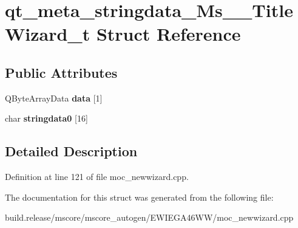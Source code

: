 \hypertarget{structqt__meta__stringdata___ms_____title_wizard__t}{}\section{qt\+\_\+meta\+\_\+stringdata\+\_\+\+Ms\+\_\+\+\_\+\+Title\+Wizard\+\_\+t Struct Reference}
\label{structqt__meta__stringdata___ms_____title_wizard__t}
\subsection*{Public Attributes}
\begin{DoxyCompactItemize}
\item 
\mbox{\label{structqt__meta__stringdata___ms_____title_wizard__t_afd8c085bfa4a76696a9c44feccee56f9}} 
Q\+Byte\+Array\+Data {\bfseries data} \mbox{[}1\mbox{]}
\item 
\mbox{\label{structqt__meta__stringdata___ms_____title_wizard__t_a6640ce8530a2f3f363992cce1e2135d3}} 
char {\bfseries stringdata0} \mbox{[}16\mbox{]}
\end{DoxyCompactItemize}


\subsection{Detailed Description}


Definition at line 121 of file moc\+\_\+newwizard.\+cpp.



The documentation for this struct was generated from the following file\+:\begin{DoxyCompactItemize}
\item 
build.\+release/mscore/mscore\+\_\+autogen/\+E\+W\+I\+E\+G\+A46\+W\+W/moc\+\_\+newwizard.\+cpp\end{DoxyCompactItemize}
